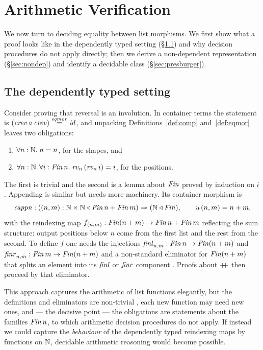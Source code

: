 \documentclass{fundam}
\begin{document}
\section{Arithmetic Verification}\label{sec:arith}

We now turn to deciding equality between list morphisms.  We first show what a proof
looks like in the dependently typed setting (\S\ref{sec:dependent}) and why decision
procedures do not apply directly; then we derive a non-dependent representation
(\S\ref{sec:nondep}) and identify a decidable class (\S\ref{sec:presburger}).

\subsection{The dependently typed setting}\label{sec:dependent}

Consider proving that reversal is an involution.  In container terms the statement is
$(\mathit{crev} \circ \mathit{crev}) \mathrel{\stackrel{\mathit{eqmor}}{=}} \mathit{id}$, and unpacking Definitions~\ref{def:comp}
and~\ref{def:eqmor} leaves two obligations:
\begin{enumerate}[leftmargin=2em]
\item $\forall n : \mathbb{N}.\; n = n$, for the shapes, and
\item $\forall n : \mathbb{N}.\, \forall i : \mathit{Fin}\,n.\; \mathit{rv}_n\,(\mathit{rv}_n\,i) = i$, for the
  positions.
\end{enumerate}
The first is trivial and the second is a lemma about $\mathit{Fin}$ proved by induction on $i$.
Appending is similar but needs more machinery.  Its container morphism is
\[
  \mathit{cappn} : ((n,m) : \mathbb{N} \times \mathbb{N} \triangleleft \mathit{Fin}\,n + \mathit{Fin}\,m) \Rightarrow (\mathbb{N} \triangleleft \mathit{Fin}),
  \qquad u\,(n,m) = n + m,
\]
with the reindexing map $f_{(n,m)} : \mathit{Fin}(n+m) \to \mathit{Fin}\,n + \mathit{Fin}\,m$ reflecting the
sum structure: output positions below $n$ come from the first list and the rest from the
second.  To define $f$ one needs the injections
$\mathit{finl}_{n,m} : \mathit{Fin}\,n \to \mathit{Fin}(n+m)$ and $\mathit{finr}_{n,m} : \mathit{Fin}\,m \to \mathit{Fin}(n+m)$
and a non-standard eliminator for $\mathit{Fin}(n + m)$ that splits an element into its $\mathit{finl}$
or $\mathit{finr}$ component \cite{PrinceGhaniMcBride08}.  Proofs about $\mathbin{+\!\!+}$ then proceed
by that eliminator.

This approach captures the arithmetic of list functions elegantly, but the definitions and
eliminators are non-trivial \cite{PrinceGhaniMcBride08}, each new function may need new
ones, and --- the decisive point --- the obligations are statements about the families
$\mathit{Fin}\,n$, to which arithmetic decision procedures do not apply.  If instead we could
capture the \emph{behaviour} of the dependently typed reindexing maps by functions on
$\mathbb{N}$, decidable arithmetic reasoning would become possible.
\end{document}
